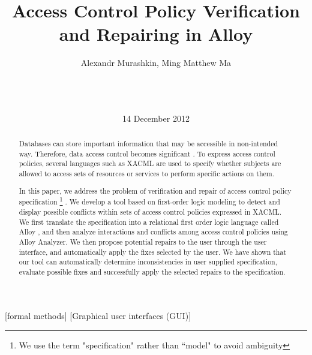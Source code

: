 \documentclass[letterpaper]{acm_proc_article-sp}
\begin{document}
\title{Access Control Policy Verification and Repairing in Alloy}


\author{
\alignauthor Alexandr Murashkin, Ming Matthew Ma \\
       \\
       \\
       \\
}
\date{14 December 2012}
\maketitle

\begin{abstract}

Databases can store important information that may be accessible in non-intended way. Therefore, data access control becomes significant \cite{Fisler:2005:VCA:1062455.1062502}. To express access control policies, several languages such as XACML \cite{oasis:xacml} are used to specify whether subjects are allowed to access sets of resources or services to perform specific actions on them. 

In this paper, we address the problem of verification and repair of access control policy specification \footnote[1]{We use the term "specification" rather than ``model" to avoid ambiguity} . We develop a tool based on first-order logic modeling to detect and display possible conflicts within sets of access control policies expressed in XACML. We first translate the specification into a relational first order logic language called Alloy \cite{jackson:alloy}, and then analyze interactions and conflicts among access control policies using Alloy Analyzer. We then propose potential repairs to the user through the user interface, and automatically apply the fixes selected by the user. We have shown that our tool can automatically determine inconsistencies in user supplied specification, evaluate possible fixes and successfully apply the selected repairs to the specification. 

\end{abstract}

[formal methods]
[Graphical user interfaces (GUI)]
\end{document}
